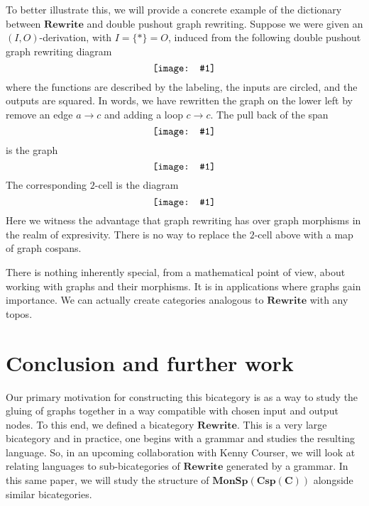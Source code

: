 \documentclass[11pt]{amsart}
\newcommand{\cat}[1]{\mathbf{#1}}
\newcommand{\diagram}[1]{\raisebox{-0.5\height}{\texttt{[image: \#1]}}}
\theoremstyle{remark}
\theoremstyle{definition}
\begin{document}
To better illustrate this, we will provide a concrete example of the dictionary between $\cat{Rewrite}$ and double pushout graph rewriting.  Suppose we were given an $(I,O)$-derivation, with $I=\{\ast\}=O$, induced from the following double pushout graph rewriting diagram
\[
	\label{NoRef_DPOGraphRewritingExample}
	\diagram{NoRef_DPOGraphRewritingExample}
\]
where the functions are described by the labeling, the inputs are circled, and the outputs are squared. In words, we have rewritten the graph on the lower left by remove an edge $a \to c$ and adding a loop $c \to c$. The pull back of the span
\[
	\label{NoRef_DPOGraphRewritingExample2}
	\diagram{NoRef_DPOGraphRewritingExample2}
\]
is the graph
\[
	\label{NoRef_DPOGraphRewritingExample3}
	\diagram{NoRef_DPOGraphRewritingExample3}
\]
The corresponding $2$-cell is the diagram
\[
	\label{NoRef_DPOGraphRewritingExample4}
	\diagram{NoRef_DPOGraphRewritingExample4}
\]
Here we witness the advantage that graph rewriting has over graph morphisms in the realm of expresivity. There is no way to replace the $2$-cell above with a map of graph cospans. 

There is nothing inherently special, from a mathematical point of view, about working with graphs and their morphisms.  It is in applications where graphs gain importance.  We can actually create categories analogous to $\cat{Rewrite}$ with any topos.  
%
%
%
%
%
%
\section{Conclusion and further work}  %

Our primary motivation for constructing this bicategory is as a way to study the gluing of graphs together in a way compatible with chosen input and output nodes. To this end, we defined a bicategory $\cat{Rewrite}$. This is a very large bicategory and in practice, one begins with a grammar and studies the resulting language. So, in an upcoming collaboration with Kenny Courser, we will look at relating languages to sub-bicategories of $\cat{Rewrite}$ generated by a grammar. In this same paper, we will study the structure of $\cat{MonSp(Csp(C))}$ alongside similar bicategories. 


%
% 
\end{document}
